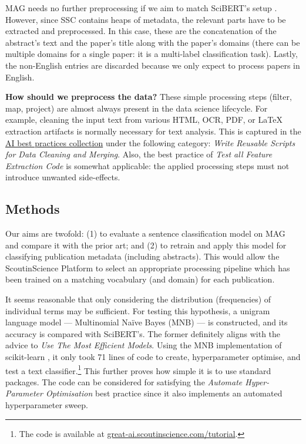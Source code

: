 MAG needs no further preprocessing if we aim to match SciBERT's setup \cite{beltagy2019scibert}. However, since SSC contains heaps of metadata, the relevant parts have to be extracted and preprocessed. In this case, these are the concatenation of the abstract's text and the paper's title along with the paper's domains (there can be multiple domains for a single paper: it is a multi-label classification task). Lastly, the non-English entries are discarded because we only expect to process papers in English.

\begin{displayquote}
\textbf{How should we preprocess the data?} These simple processing steps (filter, map, project) are almost always present in the data science lifecycle. For example, cleaning the input text from various HTML, OCR, PDF, or \LaTeX \hskip 0.12cm extraction artifacts is normally necessary for text analysis. This is captured in the \href{https://se-ml.github.io/practices}{AI best practices collection} under the following category: \textit{Write Reusable Scripts for Data Cleaning and Merging}. Also, the best practice of \textit{Test all Feature Extraction Code} is somewhat applicable: the applied processing steps must not introduce unwanted side-effects.
\end{displayquote}

\subsection{Methods}

Our aims are twofold: (1) to evaluate a sentence classification model on MAG and compare it with the prior art; and (2) to retrain and apply this model for classifying publication metadata (including abstracts). This would allow the ScoutinScience Platform to select an appropriate processing pipeline which has been trained on a matching vocabulary (and domain) for each publication. 

It seems reasonable that only considering the distribution (frequencies) of individual terms may be sufficient. For testing this hypothesis, a unigram language model --- Multinomial Naïve Bayes (MNB) --- is constructed, and its accuracy is compared with SciBERT's. The former definitely aligns with the advice to \textit{Use The Most Efficient Models}. Using the MNB implementation of scikit-learn \cite{pedregosa2011scikit}, it only took 71 lines of code to create, hyperparameter optimise, and test a text classifier.\footnote{The code is available at \href{https://great-ai.scoutinscience.com/tutorial/}{great-ai.scoutinscience.com/tutorial}.} This further proves how simple it is to use standard packages. The code can be considered for satisfying the \textit{Automate Hyper-Parameter Optimisation} best practice since it also implements an automated hyperparameter sweep. 

